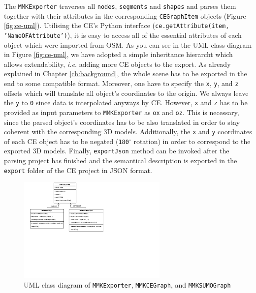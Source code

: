 The \texttt{MMKExporter} traverses all \texttt{nodes}, \texttt{segments} and \texttt{shapes} and parses them together with their attributes in the corresponding \texttt{CEGraphItem} objects (Figure \ref{fig:ce-uml}). Utilising the CE's Python interface (\texttt{ce.getAttribute(item, 'NameOFAttribute')}), it is easy to access all of the essential attributes of each object which were imported from OSM. As you can see in the UML class diagram in Figure \ref{fig:ce-uml}, we have adopted a simple inheritance hierarcht which allows extendability, \emph{i.e.} adding more CE objects to the export. As already explained in Chapter \ref{ch:background}, the whole scene has to be exported in the end to some compatible format. Moreover, one have to specify the \texttt{x}, \texttt{y}, and \texttt{z} offsets which will translate all object's coordinates to the origin. We always leave the \texttt{y} to \texttt{0} since data is interpolated anyways by CE. However, \texttt{x} and \texttt{z} has to be provided as input parameters to \texttt{MMKExporter} as \texttt{ox} and \texttt{oz}. This is necessary, since the parsed object's coordinates has to be also translated in order to stay coherent with the corresponding 3D models. Additionally, the \texttt{x} and \texttt{y} coordinates of each CE object has to be negated (\texttt{180$^{\circ}$} rotation) in order to correspond to the exported 3D models. Finally, \texttt{exportJson} method can be invoked after the parsing project has finished and the semantical description is exported in the \texttt{export} folder of the CE project in JSON format.

\begin{figure}[htb]
	\centering
	\includegraphics[width=0.65\textwidth]{figures/ce-overview-uml}
	\caption{UML class diagram of \texttt{MMKExporter}, \texttt{MMKCEGraph}, and  \texttt{MMKSUMOGraph}}
	\label{fig:ce-overview-uml}
\end{figure}

